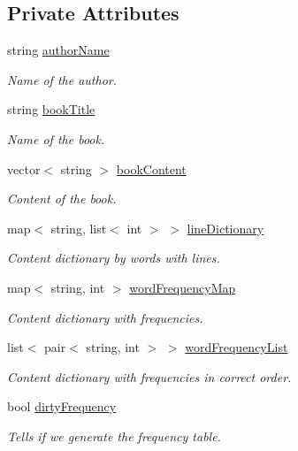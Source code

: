 \subsection*{Private Attributes}
\begin{DoxyCompactItemize}
\item 
string \hyperlink{class_book_a0dcb8f78ffb56c34e28f5d672b422e2a}{author\+Name}
\begin{DoxyCompactList}\small\item\em Name of the author. \end{DoxyCompactList}\item 
string \hyperlink{class_book_a111d7b30bddd6166bd09764f050cfee3}{book\+Title}
\begin{DoxyCompactList}\small\item\em Name of the book. \end{DoxyCompactList}\item 
vector$<$ string $>$ \hyperlink{class_book_a62ca3f4431b699fa41384c8bab7ef4fa}{book\+Content}
\begin{DoxyCompactList}\small\item\em Content of the book. \end{DoxyCompactList}\item 
map$<$ string, list$<$ int $>$ $>$ \hyperlink{class_book_a7da5c2f5239458c2ab88576cac8d0a10}{line\+Dictionary}
\begin{DoxyCompactList}\small\item\em Content dictionary by words with lines. \end{DoxyCompactList}\item 
map$<$ string, int $>$ \hyperlink{class_book_a18b73c8d2b492cad5b7b0c187b08dfc0}{word\+Frequency\+Map}
\begin{DoxyCompactList}\small\item\em Content dictionary with frequencies. \end{DoxyCompactList}\item 
list$<$ pair$<$ string, int $>$ $>$ \hyperlink{class_book_aa9035db1c21cf61eb3af84ad69829069}{word\+Frequency\+List}
\begin{DoxyCompactList}\small\item\em Content dictionary with frequencies in correct order. \end{DoxyCompactList}\item 
bool \hyperlink{class_book_ad1df1050750f0605efdfab51b86c0765}{dirty\+Frequency}
\begin{DoxyCompactList}\small\item\em Tells if we generate the frequency table. \end{DoxyCompactList}\item 

\end{DoxyCompactItemize}

